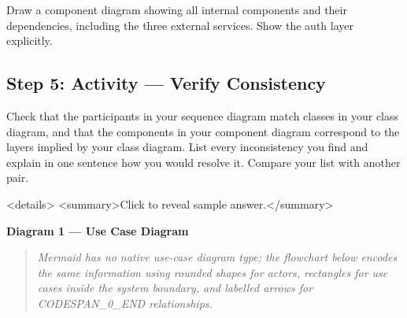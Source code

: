 \documentclass[11pt,a4paper]{book}
\begin{document}
Draw a component diagram showing all internal components and their dependencies, including the three external services. Show the auth layer explicitly.

\subsection{Step 5: Activity --- Verify Consistency}

Check that the participants in your sequence diagram match classes in your class diagram, and that the components in your component diagram correspond to the layers implied by your class diagram. List every inconsistency you find and explain in one sentence how you would resolve it. Compare your list with another pair.

<details>
<summary>Click to reveal sample answer.</summary>

\textbf{Diagram 1 --- Use Case Diagram}

\begin{quote}
\textit{Mermaid has no native use-case diagram type; the flowchart below encodes the same information using rounded shapes for actors, rectangles for use cases inside the system boundary, and labelled arrows for CODESPAN\_0\_END relationships.}
\end{quote}
\end{document}
